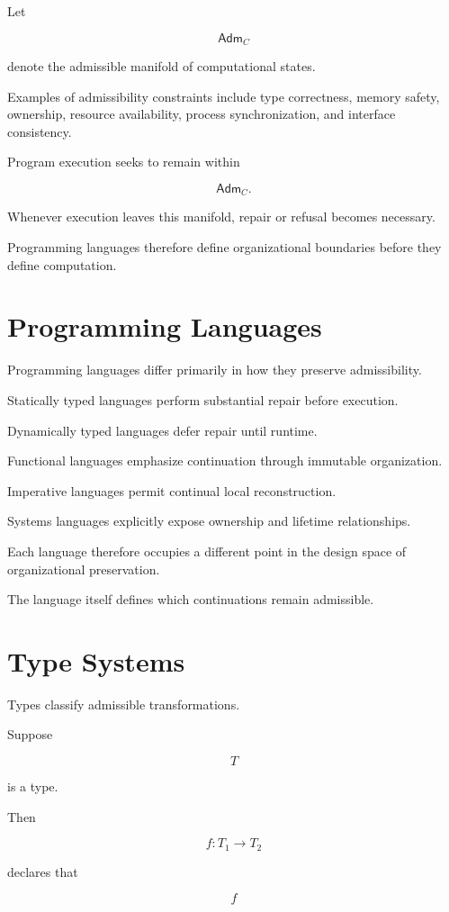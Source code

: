 \documentclass[11pt,oneside]{book}
\numberwithin{equation}{chapter}
\theoremstyle{definition}
\theoremstyle{plain}
\newcommand{\Adm}{\mathsf{Adm}}
\begin{document}
Let

\[
\Adm_C
\]

denote the admissible manifold of computational states.

Examples of admissibility constraints include type correctness, memory
safety, ownership, resource availability, process synchronization, and
interface consistency.

Program execution seeks to remain within

\[
\Adm_C.
\]

Whenever execution leaves this manifold, repair or refusal becomes
necessary.

Programming languages therefore define organizational boundaries before
they define computation.

\section{Programming Languages}

Programming languages differ primarily in how they preserve admissibility.

Statically typed languages perform substantial repair before execution.

Dynamically typed languages defer repair until runtime.

Functional languages emphasize continuation through immutable organization.

Imperative languages permit continual local reconstruction.

Systems languages explicitly expose ownership and lifetime relationships.

Each language therefore occupies a different point in the design space of
organizational preservation.

The language itself defines which continuations remain admissible.

\section{Type Systems}

Types classify admissible transformations.

Suppose

\[
T
\]

is a type.

Then

\[
f:T_1
\rightarrow
T_2
\]

declares that

\[
f
\]
\end{document}

